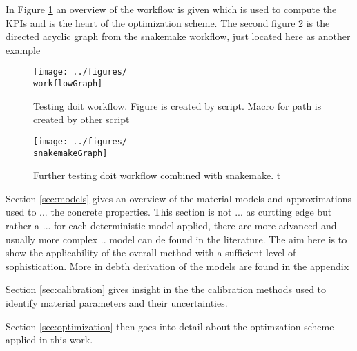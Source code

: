 In Figure \ref{fig:workflow} an overview of the workflow is given which is used to compute the KPIs and is the heart of the optimization scheme.
The second figure \ref{fig:snakemake_workflow} is the directed acyclic graph from the snakemake workflow, just located here as another example
\begin{figure}[ht]%
	\centering
	\texttt{[image: ../figures/\\workflowGraph]}
	\caption{Testing doit workflow. Figure is created by script. Macro for path is created by other script}\label{fig:workflow}
\end{figure}
\begin{figure}[ht]%
\centering
\texttt{[image: ../figures/\\snakemakeGraph]}
\caption{Further testing doit workflow combined with snakemake. t}\label{fig:snakemake_workflow}
\end{figure}

Section \ref{sec:models} gives an overview of the material models and approximations used to ... the concrete properties.
This section is not ... as curtting edge but rather a ... 
for each deterministic model applied, there are more advanced and usually more complex .. model can de found in the literature.
The aim here is to show the applicability of the overall method with a sufficient level of sophistication.
More in debth derivation of the models are found in the appendix

Section \ref{sec:calibration} gives insight in the the calibration methods used to identify material parameters and their uncertainties.

Section \ref{sec:optimization} then goes into detail about the optimzation scheme applied in this work.

